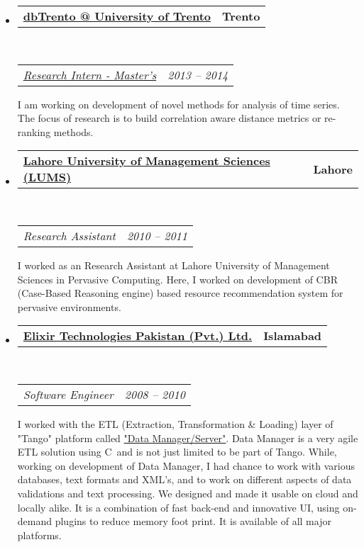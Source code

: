 \documentclass[10pt,letterpaper]{article}
\makeatletter
\newcommand{\headerrow}[2]
{\begin{tabular*}{\linewidth}{l@{\extracolsep{\fill}}r}
	#1 &
	#2 \\
\end{tabular*}}
\newcommand{\CPP}
{C\nolinebreak[4]\hspace{-.05em}\raisebox{.22ex}{\footnotesize\bf ++}}
\makeatother
\begin{document}
\begin{itemize}
	\parskip=0.1em

	\item
	\headerrow
		{\textbf{\href{http://db.disi.unitn.eu/}{dbTrento @ University of Trento}}}
		{\textbf{Trento}}
	\\
	\headerrow
		{\emph{\href{http://db.disi.unitn.eu/index.html#content=Muhammad\%20Usman\%20Akram}{Research Intern - Master's}}}
		{\emph{2013 -- 2014}}
	\begin{itemize*}
          	I am working on development of novel methods for analysis of time series. The focus of research is to build correlation aware distance metrics or re-ranking methods.
	\end{itemize*}
	
	
	\item
	\headerrow
		{\textbf{\href{http://www.lums.edu.pk}{Lahore University of Management Sciences (LUMS)}}}
		{\textbf{Lahore}}
	\\
	\headerrow
		{\emph{Research Assistant}}
		{\emph{2010 -- 2011}}
	\begin{itemize*}
          	I worked as an Research Assistant at Lahore University of Management Sciences in Pervasive Computing. Here, I worked on development of CBR (Case-Based Reasoning engine) based resource recommendation system for pervasive environments.
	\end{itemize*}

	\item
	\headerrow
		{\textbf{\href{http://www.elixir.com}{Elixir Technologies Pakistan (Pvt.) Ltd.}}}
		{\textbf{Islamabad}}
	\\
	\headerrow
		{\emph{Software Engineer}}
		{\emph{2008 -- 2010}}
	\begin{itemize*}
		I  worked with the ETL (Extraction, Transformation \& Loading) layer of "Tango" platform called \href{http://tango.elixir.com/TangoSolutionsFramework/Data.html}{"Data Manager/Server"}. Data Manager is a very agile ETL solution using \CPP \ and is not just limited to be part of Tango. While, working on development of Data Manager, I had chance to work with various databases, text formats and XML's, and to work on different aspects of data validations and text processing. We designed and made it usable on cloud and locally alike. It is a combination of fast back-end and innovative UI, using on-demand plugins to reduce memory foot print. It is available of all major platforms.
	\end{itemize*}
\end{itemize}
\end{document}
